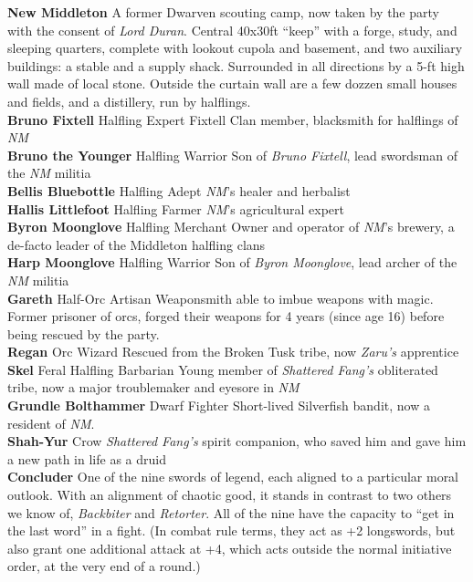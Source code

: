 \documentclass[letterpaper]{article}
\newcommand{\person}[3]{\noindent\textbf{#1
    \ifstrequal{#2}{M}{{\color{ProcessBlue}\male}}{%
    \ifstrequal{#2}{F}{\color{VioletRed}\female}{}}}{\scriptsize #3}}
\begin{document}
\noindent\textbf{New Middleton} A former Dwarven scouting camp, now taken by the party with the consent of \emph{Lord Duran}.  Central 40x30ft ``keep'' with a forge, study, and sleeping quarters, complete with lookout cupola and basement, and two auxiliary buildings: a stable and a supply shack. Surrounded in all directions by a 5-ft high wall made of local stone. Outside the curtain wall are a few dozzen small houses and fields, and a distillery, run by halflings. \\
\person{Bruno Fixtell}{M}{Halfling Expert} Fixtell Clan member, blacksmith for halflings of \emph{NM} \\
\person{Bruno the Younger}{M}{Halfling Warrior} Son of \emph{Bruno Fixtell}, lead swordsman of the \emph{NM} militia \\
\person{Bellis Bluebottle}{F}{Halfling Adept} \emph{NM}'s healer and herbalist \\
\person{Hallis Littlefoot}{F}{Halfling Farmer} \emph{NM}'s agricultural expert \\
\person{Byron Moonglove}{M}{Halfling Merchant} Owner and operator of \emph{NM}'s brewery, a de-facto leader of the Middleton halfling clans \\
\person{Harp Moonglove}{M}{Halfling Warrior} Son of \emph{Byron Moonglove}, lead archer of the \emph{NM} militia \\
\person{Gareth}{M}{Half-Orc Artisan} Weaponsmith able to imbue weapons with magic. Former prisoner of orcs, forged their weapons for 4 years (since age 16) before being rescued by the party. \\
\person{Regan}{M}{Orc Wizard} Rescued from the Broken Tusk tribe, now \emph{Zaru's} apprentice \\
\person{Skel}{M}{Feral Halfling Barbarian} Young member of \emph{Shattered Fang's} obliterated tribe, now a major troublemaker and eyesore in \emph{NM} \\
\person{Grundle Bolthammer}{F}{Dwarf Fighter} Short-lived Silverfish bandit, now a resident of \emph{NM}.\\
\person{Shah-Yur}{M}{Crow} \emph{Shattered Fang's} spirit companion, who saved him and gave him a new path in life as a druid\\
\noindent\textbf{Concluder} One of the nine swords of legend, each aligned to a particular moral outlook. With an alignment of chaotic good, it stands in contrast to two others we know of, \emph{Backbiter} and \emph{Retorter}. All of the nine have the capacity to ``get in the last word'' in a fight. (In combat rule terms, they act as +2 longswords, but also grant one additional attack at +4, which acts outside the normal initiative order, at the very end of a round.)\\
\end{document}
